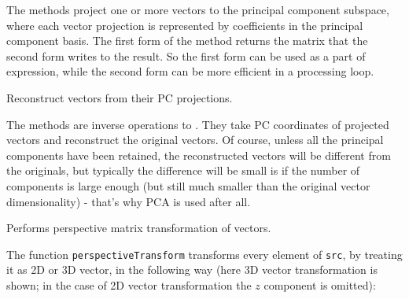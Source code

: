 The methods project one or more vectors to the principal component subspace, where each vector projection is represented by coefficients in the principal component basis. The first form of the method returns the matrix that the second form writes to the result. So the first form can be used as a part of expression, while the second form can be more efficient in a processing loop. 

Reconstruct vectors from their PC projections.

\begin{description}
\end{description}

The methods are inverse operations to . They take PC coordinates of projected vectors and reconstruct the original vectors. Of course, unless all the principal components have been retained, the reconstructed vectors will be different from the originals, but typically the difference will be small is if the number of components is large enough (but still much smaller than the original vector dimensionality) - that's why PCA is used after all. 

Performs perspective matrix transformation of vectors.

\begin{description}
\end{description}

The function \texttt{perspectiveTransform} transforms every element of \texttt{src},
by treating it as 2D or 3D vector, in the following way (here 3D vector transformation is shown; in the case of 2D vector transformation the $z$ component is omitted):

